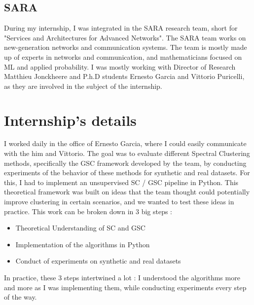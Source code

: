 \documentclass[a4paper,12pt]{article}
\theoremstyle{definition}
\theoremstyle{plain}
\begin{document}
\subsection{SARA}
During my internship, I was integrated in the SARA research team, short for "Services and Architectures for Advanced Networks". The SARA team works on new-generation networks and communication systems. The team is mostly made up of experts in networks and communication, and mathematicians focused on ML and applied probability. I was mostly working with Director of Research Matthieu Jonckheere and P.h.D students Ernesto Garcia and Vittorio Puricelli, as they are involved in the subject of the internship.

\section{Internship's details }
I worked daily in the office of Ernesto Garcia, where I could easily communicate with the him and Vittorio. The goal was to evaluate different Spectral Clustering methods, specifically the GSC framework developed by the team, by conducting experiments of the behavior of these methods for synthetic and real datasets. For this, I had to implement an unsupervised SC / GSC pipeline in Python. This theoretical framework was built on ideas that the team thought could potentially improve clustering in certain scenarios, and we wanted to test these ideas in practice.
This work can be broken down in $3$ big steps : 
\begin{itemize}
	\item Theoretical Understanding of SC and GSC
	\item Implementation of the algorithms in Python
	\item Conduct of experiments on synthetic and real datasets
\end{itemize}
In practice, these $3$ steps intertwined a lot : I understood the algorithms more and more as I was implementing them, while conducting experiments every step of the way.
\end{document}
